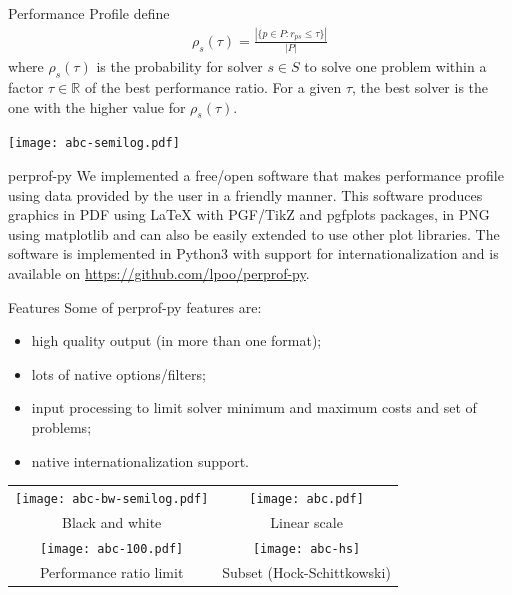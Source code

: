 \documentclass[a0paper,portrait]{baposter}
\begin{document}
\begin{poster}
\begin{posterbox}[column=0,below=auto]{Performance Profile}
    \textcite{Dolan2001} define
    \begin{align*}
      \rho_s(\tau) = \frac{| \{p \in P: r_{ps} \leq \tau\} |}{| P |}
    \end{align*}
    where $\rho_s(\tau)$ is the probability for solver $s \in S$ to solve one
    problem within a factor $\tau \in \mathbb{R}$ of the best performance
    ratio. For a given $\tau$, the best solver is the one with the higher
    value for $\rho_s(\tau)$.

    \texttt{[image: abc-semilog.pdf]}
  \end{posterbox}

  \begin{posterbox}[column=0,below=auto,name=perprof]{perprof-py}
    We implemented a free/open software that makes performance profile using data
    provided by the user in a friendly manner. This software produces graphics in PDF
    using LaTeX with PGF/TikZ and pgfplots packages,
    in PNG using matplotlib and can also be easily extended to
    use other plot libraries. The software is implemented in Python3 with
    support for internationalization and is available on
    \url{https://github.com/lpoo/perprof-py}.
  \end{posterbox}

  \begin{posterbox}[column=1]{Features}
    Some of perprof-py features are:
    \begin{itemize}[noitemsep]
      \item high quality output (in more than one format);
      \item lots of native options/filters;
      \item input processing to limit solver minimum and maximum costs and set
        of problems;
      \item native internationalization support.
    \end{itemize}

    \begin{center}
      \begin{tabular}{cc}
        \texttt{[image: abc-bw-semilog.pdf]} &
        \texttt{[image: abc.pdf]} \\
        Black and white & Linear scale \\
        \texttt{[image: abc-100.pdf]} &
        \texttt{[image: abc-hs]} \\
        Performance ratio limit & Subset (Hock-Schittkowski)
      \end{tabular}
    \end{center}


\end{posterbox}
\end{poster}
\end{document}
